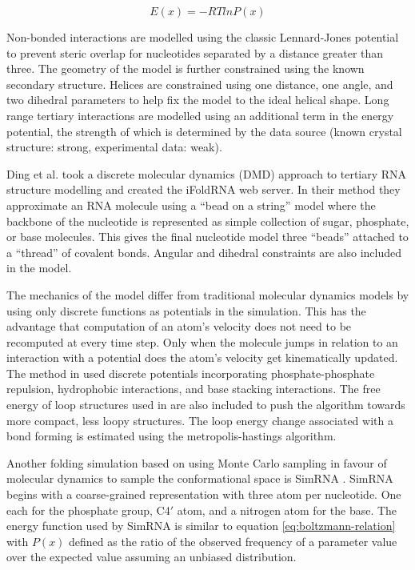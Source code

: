 \documentclass[journal]{IEEEtran}
\begin{document}
\begin{equation}
\label{eq:boltzmann-relation}
	E(x) = -RT ln P(x)
\end{equation}

Non-bonded interactions are modelled using the classic Lennard-Jones potential to prevent steric overlap for nucleotides separated by a distance greater than three. The geometry of the model is further constrained using the known secondary structure. Helices are constrained using one distance, one angle, and two dihedral parameters to help fix the model to the ideal helical shape. Long range tertiary interactions are modelled using an additional term in the energy potential, the strength of which is determined by the data source (known crystal structure: strong, experimental data: weak).

Ding et al. \cite{ding2008ab} took a discrete molecular dynamics (DMD) approach to tertiary RNA structure modelling and created the iFoldRNA web server. In their method they approximate an RNA molecule using a ``bead on a string'' model where the backbone of the nucleotide is represented as simple collection of sugar, phosphate, or base molecules. This gives the final nucleotide model three ``beads'' attached to a ``thread'' of covalent bonds. Angular and dihedral constraints are also included in the model.

The mechanics of the model differ from traditional molecular dynamics models by using only discrete functions as potentials in the simulation. This has the advantage that computation of an atom's velocity does not need to be recomputed at every time step. Only when the molecule jumps in relation to an interaction with a potential does the atom's velocity get kinematically updated. The method in \cite{ding2008ab} used discrete potentials incorporating phosphate-phosphate repulsion, hydrophobic interactions, and base stacking interactions. The free energy of loop structures used in \cite{mathews1999expanded} are also included to push the algorithm towards more compact, less loopy structures. The loop energy change associated with a bond forming is estimated using the metropolis-hastings algorithm.

Another folding simulation based on using Monte Carlo sampling in favour of molecular dynamics to sample the conformational space is SimRNA \cite{rother2012template}. SimRNA begins with a coarse-grained representation with three atom per nucleotide. One each for the phosphate group, C4$'$ atom, and a nitrogen atom for the base. The energy function used by SimRNA is similar to equation \ref{eq:boltzmann-relation} with $P(x)$ defined as the ratio of the observed frequency of a parameter value over the expected value assuming an unbiased distribution. 
\end{document}
